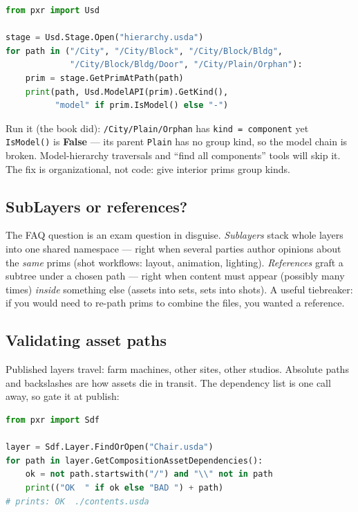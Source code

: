 \begin{lstlisting}[language=Python]
from pxr import Usd

stage = Usd.Stage.Open("hierarchy.usda")
for path in ("/City", "/City/Block", "/City/Block/Bldg",
             "/City/Block/Bldg/Door", "/City/Plain/Orphan"):
    prim = stage.GetPrimAtPath(path)
    print(path, Usd.ModelAPI(prim).GetKind(),
          "model" if prim.IsModel() else "-")
\end{lstlisting}

\begin{Gotcha}
Run it (the book did): \texttt{/City/Plain/Orphan} has
\texttt{kind = component} yet \texttt{IsModel()} is \textbf{False} --- its
parent \texttt{Plain} has no group kind, so the model chain is broken.
Model-hierarchy traversals and ``find all components'' tools will skip it.
The fix is organizational, not code: give interior prims group kinds.
\end{Gotcha}

\subsection{SubLayers or references?}\label{sec:pd-subref}
The FAQ question is an exam question in disguise. \emph{Sublayers} stack whole
layers into one shared namespace --- right when several parties author
opinions about the \emph{same} prims (shot workflows: layout, animation,
lighting). \emph{References} graft a subtree under a chosen path --- right
when content must appear (possibly many times) \emph{inside} something else
(assets into sets, sets into shots). A useful tiebreaker: if you would need to
re-path prims to combine the files, you wanted a reference.

\subsection{Validating asset paths}\label{sec:pd-paths}
Published layers travel: farm machines, other sites, other
studios. Absolute paths and backslashes are how assets die in transit. The
dependency list is one call away, so gate it at publish:

\begin{lstlisting}[language=Python]
from pxr import Sdf

layer = Sdf.Layer.FindOrOpen("Chair.usda")
for path in layer.GetCompositionAssetDependencies():
    ok = not path.startswith("/") and "\\" not in path
    print(("OK  " if ok else "BAD ") + path)
# prints: OK  ./contents.usda
\end{lstlisting}

